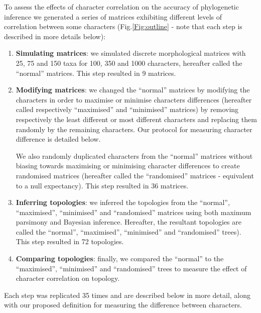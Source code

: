 \documentclass[12pt,letterpaper]{article}
\begin{document}
To assess the effects of character correlation on the accuracy of phylogenetic inference we generated a series of matrices exhibiting different levels of correlation between some characters (Fig.\ref{Fig:outline} - note that each step is described in more details below):
\begin{enumerate}
    \item \textbf{Simulating matrices}: we simulated discrete morphological matrices with 25, 75 and 150 taxa for 100, 350 and 1000 characters, hereafter called the ``normal'' matrices. This step resulted in 9 matrices.

    \item \textbf{Modifying matrices}: we changed the ``normal'' matrices by modifying the characters in order to maximise or minimise characters differences (hereafter called respectively ``maximised'' and ``minimised'' matrices) by removing respectively the least different or most different characters and replacing them randomly by the remaining characters. Our protocol for measuring character difference is detailed below.
 
    We also randomly duplicated characters from the ``normal'' matrices without biasing towards maximising or minimising character differences to create randomised matrices (hereafter called the ``randomised'' matrices - equivalent to a null expectancy). This step resulted in 36 matrices.

\item \textbf{Inferring topologies}: we inferred the topologies from the ``normal'', ``maximised'', ``minimised'' and ``randomised'' matrices using both maximum parsimony and Bayesian inference.
Hereafter, the resultant topologies are called the ``normal'', ``maximised'', ``minimised'' and ``randomised'' trees).
This step resulted in 72 topologies.
    \item \textbf{Comparing topologies}: finally, we compared the ``normal'' to the ``maximised'', ``minimised'' and ``randomised'' trees to measure the effect of character correlation on topology.
\end{enumerate}
Each step was replicated 35 times and are described below in more detail, along with our proposed definition for measuring the difference between characters.
\end{document}
